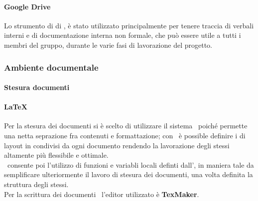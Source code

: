     \paragraph{Google Drive}
      Lo strumento di  di , è stato utilizzato principalmente per tenere traccia di verbali interni e di documentazione interna
      non formale, che può essere utile a tutti i membri del gruppo, durante le varie fasi di lavorazione del progetto.
  \subsubsection{Ambiente documentale}

    \paragraph{Stesura documenti}
      \paragraph{\LaTeX}
        Per la stesura dei documenti si è scelto di utilizzare il sistema \glossaryItem{\LaTeX}\ poiché permette una netta seprazione fra contenuti
        e formattazione; con \glossaryItem{\LaTeX}\ è possible definire i  di layout in  condivisi da ogni documento rendendo la lavorazione
        degli stessi altamente più flessibile e ottimale.\\
        \glossaryItem{\LaTeX}\ consente poi l'utilizzo di funzioni e variabli locali definti dall', in maniera tale da semplificare ulteriormente
        il lavoro di stesura dei documenti, una volta definita la struttura degli stessi.\\
        Per la scrittura dei documenti \glossaryItem{\LaTeX}\ l'editor utilizzato è \textbf{TexMaker}.
